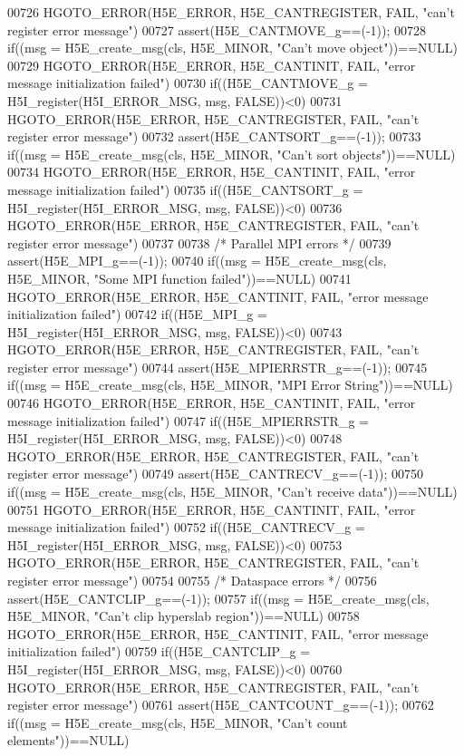 \begin{DoxyCode}
00726     HGOTO\_ERROR(H5E\_ERROR, H5E\_CANTREGISTER, FAIL, "can't register error message")
00727 assert(H5E\_CANTMOVE\_g==(-1));
00728 if((msg = H5E\_create\_msg(cls, H5E\_MINOR, "Can't move \textcolor{keywordtype}{object}"))==NULL)
00729     HGOTO\_ERROR(H5E\_ERROR, H5E\_CANTINIT, FAIL, "error message initialization failed")
00730 if((H5E\_CANTMOVE\_g = H5I\_register(H5I\_ERROR\_MSG, msg, FALSE))<0)
00731     HGOTO\_ERROR(H5E\_ERROR, H5E\_CANTREGISTER, FAIL, "can't register error message")
00732 assert(H5E\_CANTSORT\_g==(-1));
00733 if((msg = H5E\_create\_msg(cls, H5E\_MINOR, "Can't sort objects"))==NULL)
00734     HGOTO\_ERROR(H5E\_ERROR, H5E\_CANTINIT, FAIL, "error message initialization failed")
00735 if((H5E\_CANTSORT\_g = H5I\_register(H5I\_ERROR\_MSG, msg, FALSE))<0)
00736     HGOTO\_ERROR(H5E\_ERROR, H5E\_CANTREGISTER, FAIL, "can't register error message")
00737 
00738 \textcolor{comment}{/* Parallel MPI errors */}
00739 assert(H5E\_MPI\_g==(-1));
00740 if((msg = H5E\_create\_msg(cls, H5E\_MINOR, "Some MPI function failed"))==NULL)
00741     HGOTO\_ERROR(H5E\_ERROR, H5E\_CANTINIT, FAIL, "error message initialization failed")
00742 if((H5E\_MPI\_g = H5I\_register(H5I\_ERROR\_MSG, msg, FALSE))<0)
00743     HGOTO\_ERROR(H5E\_ERROR, H5E\_CANTREGISTER, FAIL, "can't register error message")
00744 assert(H5E\_MPIERRSTR\_g==(-1));
00745 if((msg = H5E\_create\_msg(cls, H5E\_MINOR, "MPI Error String"))==NULL)
00746     HGOTO\_ERROR(H5E\_ERROR, H5E\_CANTINIT, FAIL, "error message initialization failed")
00747 if((H5E\_MPIERRSTR\_g = H5I\_register(H5I\_ERROR\_MSG, msg, FALSE))<0)
00748     HGOTO\_ERROR(H5E\_ERROR, H5E\_CANTREGISTER, FAIL, "can't register error message")
00749 assert(H5E\_CANTRECV\_g==(-1));
00750 if((msg = H5E\_create\_msg(cls, H5E\_MINOR, "Can't receive data"))==NULL)
00751     HGOTO\_ERROR(H5E\_ERROR, H5E\_CANTINIT, FAIL, "error message initialization failed")
00752 if((H5E\_CANTRECV\_g = H5I\_register(H5I\_ERROR\_MSG, msg, FALSE))<0)
00753     HGOTO\_ERROR(H5E\_ERROR, H5E\_CANTREGISTER, FAIL, "can't register error message")
00754 
00755 \textcolor{comment}{/* Dataspace errors */}
00756 assert(H5E\_CANTCLIP\_g==(-1));
00757 if((msg = H5E\_create\_msg(cls, H5E\_MINOR, "Can't clip hyperslab region"))==NULL)
00758     HGOTO\_ERROR(H5E\_ERROR, H5E\_CANTINIT, FAIL, "error message initialization failed")
00759 if((H5E\_CANTCLIP\_g = H5I\_register(H5I\_ERROR\_MSG, msg, FALSE))<0)
00760     HGOTO\_ERROR(H5E\_ERROR, H5E\_CANTREGISTER, FAIL, "can't register error message")
00761 assert(H5E\_CANTCOUNT\_g==(-1));
00762 if((msg = H5E\_create\_msg(cls, H5E\_MINOR, "Can't count elements"))==NULL)

\end{DoxyCode}
